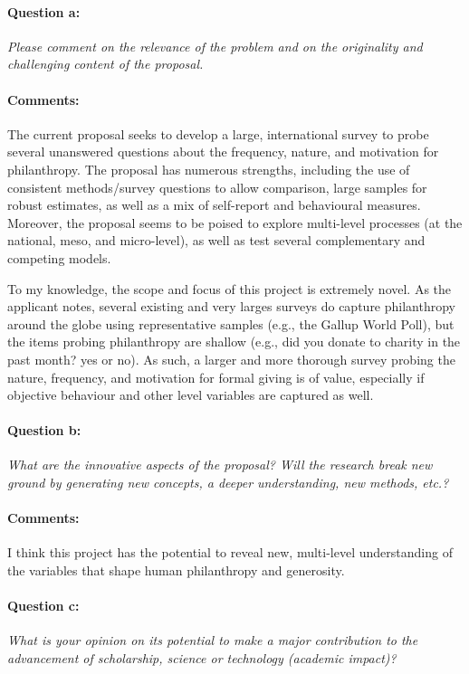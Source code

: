 \documentclass[twocolumn, serif, rga, numeric]{jote-article}
\begin{document}
\paragraph{Question a:}
\textit{Please comment on the relevance of the problem and on the originality and challenging content of the proposal.}
\paragraph{Comments:}
The current proposal seeks to develop a large, international survey to probe several unanswered questions about the frequency, nature, and motivation for philanthropy. The proposal has numerous strengths, including the use of consistent methods/survey questions to allow comparison, large samples for robust estimates, as well as a mix of self-report and behavioural measures. Moreover, the proposal seems to be poised to explore multi-level processes (at the national, meso, and micro-level), as well as test several complementary and competing models.

To my knowledge, the scope and focus of this project is extremely novel. As the applicant notes, several existing and very larges surveys do capture philanthropy around the globe using representative samples (e.g., the Gallup World Poll), but the items probing philanthropy are shallow (e.g., did you donate to charity in the past month? yes or no). As such, a larger and more thorough survey probing the nature, frequency, and motivation for formal giving is of value, especially if objective behaviour and other level variables are captured as well.
\paragraph{Question b:}
\textit{What are the innovative aspects of the proposal? Will the research break new ground by generating new concepts, a deeper understanding, new methods, etc.?}
\paragraph{Comments:}
I think this project has the potential to reveal new, multi-level understanding of the variables that shape human philanthropy and generosity.
\paragraph{Question c:}
\textit{What is your opinion on its potential to make a major contribution to the advancement of scholarship, science or technology (academic impact)?}
\end{document}
